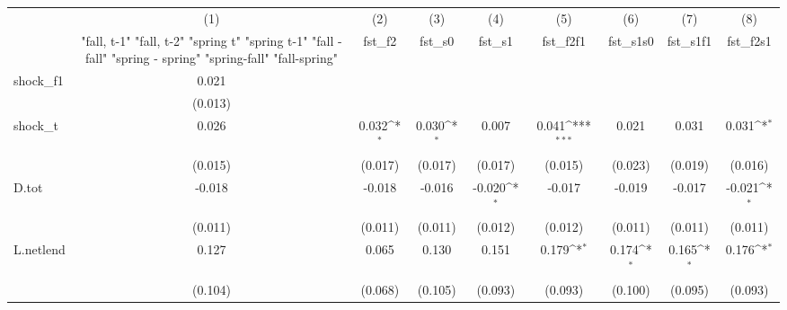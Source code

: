 {
\def\sym#1{\ifmmode^{#1}\else\(^{#1}\)\fi}
\begin{tabular}{l*{8}{c}}
\toprule
            &\multicolumn{1}{c}{(1)}&\multicolumn{1}{c}{(2)}&\multicolumn{1}{c}{(3)}&\multicolumn{1}{c}{(4)}&\multicolumn{1}{c}{(5)}&\multicolumn{1}{c}{(6)}&\multicolumn{1}{c}{(7)}&\multicolumn{1}{c}{(8)}\\
            &\multicolumn{1}{c}{  "fall, t-1" "fall, t-2" "spring t" "spring t-1"  "fall - fall" "spring - spring" "spring-fall" "fall-spring" }&\multicolumn{1}{c}{fst\_f2}&\multicolumn{1}{c}{fst\_s0}&\multicolumn{1}{c}{fst\_s1}&\multicolumn{1}{c}{fst\_f2f1}&\multicolumn{1}{c}{fst\_s1s0}&\multicolumn{1}{c}{fst\_s1f1}&\multicolumn{1}{c}{fst\_f2s1}\\
\midrule
shock\_f1    &       0.021         &                     &                     &                     &                     &                     &                     &                     \\
            &     (0.013)         &                     &                     &                     &                     &                     &                     &                     \\
\addlinespace
shock\_t     &       0.026         &       0.032\sym{*}  &       0.030\sym{*}  &       0.007         &       0.041\sym{***}&       0.021         &       0.031         &       0.031\sym{*}  \\
            &     (0.015)         &     (0.017)         &     (0.017)         &     (0.017)         &     (0.015)         &     (0.023)         &     (0.019)         &     (0.016)         \\
\addlinespace
D.tot       &      -0.018         &      -0.018         &      -0.016         &      -0.020\sym{*}  &      -0.017         &      -0.019         &      -0.017         &      -0.021\sym{*}  \\
            &     (0.011)         &     (0.011)         &     (0.011)         &     (0.012)         &     (0.012)         &     (0.011)         &     (0.011)         &     (0.011)         \\
\addlinespace
L.netlend   &       0.127         &       0.065         &       0.130         &       0.151         &       0.179\sym{*}  &       0.174\sym{*}  &       0.165\sym{*}  &       0.176\sym{*}  \\
            &     (0.104)         &     (0.068)         &     (0.105)         &     (0.093)         &     (0.093)         &     (0.100)         &     (0.095)         &     (0.093)         \\

\end{tabular}}
